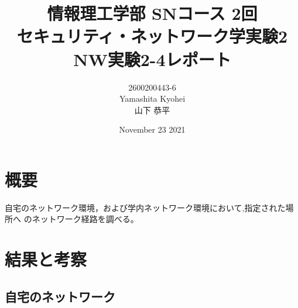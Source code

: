 \documentclass[dvipdfmx,autodetect-engine,titlepage]{jsarticle}
\title{情報理工学部 SNコース 2回\\
セキュリティ・ネットワーク学実験2\\
NW実験2-4レポート}
\author{2600200443-6\\Yamashita Kyohei\\山下 恭平}
\date{November 23 2021}
\begin{document}
\maketitle

\section{概要}
自宅のネットワーク環境，および学内ネットワーク環境において,指定された場所へ
のネットワーク経路を調べる。

\section{結果と考察}

\subsection{自宅のネットワーク}
\end{document}
